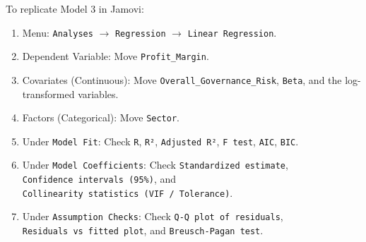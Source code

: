 \documentclass[
]{article}
\providecommand{\tightlist}{%
  \setlength{\itemsep}{0pt}\setlength{\parskip}{0pt}}
\begin{document}
To replicate Model 3 in Jamovi:

\begin{enumerate}
\def\labelenumi{\arabic{enumi}.}
\tightlist
\item
  Menu: \texttt{Analyses} \(\rightarrow\) \texttt{Regression}
  \(\rightarrow\) \texttt{Linear\ Regression}.
\item
  Dependent Variable: Move \texttt{Profit\_Margin}.
\item
  Covariates (Continuous): Move \texttt{Overall\_Governance\_Risk},
  \texttt{Beta}, and the log-transformed variables.
\item
  Factors (Categorical): Move \texttt{Sector}.
\item
  Under \texttt{Model\ Fit}: Check \texttt{R}, \texttt{R²},
  \texttt{Adjusted\ R²}, \texttt{F\ test}, \texttt{AIC}, \texttt{BIC}.
\item
  Under \texttt{Model\ Coefficients}: Check
  \texttt{Standardized\ estimate},
  \texttt{Confidence\ intervals\ (95\%)}, and
  \texttt{Collinearity\ statistics\ (VIF\ /\ Tolerance)}.
\item
  Under \texttt{Assumption\ Checks}: Check
  \texttt{Q-Q\ plot\ of\ residuals},
  \texttt{Residuals\ vs\ fitted\ plot}, and
  \texttt{Breusch-Pagan\ test}.
\end{enumerate}
\end{document}
